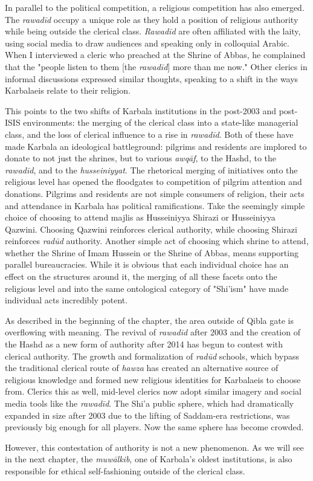 In parallel to the political competition, a religious competition has also emerged. The \emph{rawadīd} occupy a unique role as they hold a position of religious authority while being outside the clerical class. \emph{Rawadīd} are often affiliated with the laity, using social media to draw audiences and speaking only in colloquial Arabic. When I interviewed a cleric who preached at the Shrine of Abbas, he complained that the "people listen to them [the \emph{rawadīd}] more than me now." Other clerics in informal discussions expressed similar thoughts, speaking to a shift in the ways Karbalaeis relate to their religion. 

This points to the two shifts of Karbala institutions in the post-2003 and post-ISIS environments: the merging of the clerical class into a state-like managerial class, and the loss of clerical influence to a rise in \emph{rawadīd}. Both of these have made Karbala an ideological battleground: pilgrims and residents are implored to donate to not just the shrines, but to various \emph{awqāf}, to the Hashd, to the \emph{rawadīd}, and to the \emph{husseiniyyat}. The rhetorical merging of initiatives onto the religious level has opened the floodgates to competition of pilgrim attention and donations. Pilgrims and residents are not simple consumers of religion, their acts and attendance in Karbala has political ramifications. Take the seemingly simple choice of choosing to attend majlis as Husseiniyya Shirazi or Husseiniyya Qazwini. Choosing Qazwini reinforces clerical authority, while choosing Shirazi reinforces \emph{radūd} authority. Another simple act of choosing which shrine to attend, whether the Shrine of Imam Hussein or the Shrine of Abbas, means supporting parallel bureaucracies. While it is obvious that each individual choice has an effect on the structures around it, the merging of all these facets onto the religious level and into the same ontological category of "Shi'ism" have made individual acts incredibly potent. 

As described in the beginning of the chapter, the area outside of Qibla gate is overflowing with meaning. The revival of \emph{rawadīd} after 2003 and the creation of the Hashd as a new form of authority after 2014 has begun to contest with clerical authority. The growth and formalization of \emph{radūd} schools, which bypass the traditional clerical route of \emph{hawza} has created an alternative source of religious knowledge and formed new religious identities for Karbalaeis to choose from. Clerics this as well, mid-level clerics now adopt similar imagery and social media tools like the \emph{rawadīd}. The Shi'a public sphere, which had dramatically expanded in size after 2003 due to the lifting of Saddam-era restrictions, was previously big enough for all players. Now the same sphere has become crowded.

However, this contestation of authority is not a new phenomenon. As we will see in the next chapter, the \emph{muwālkib}, one of Karbala's oldest institutions, is also responsible for ethical self-fashioning outside of the clerical class. 